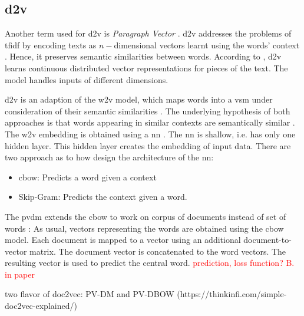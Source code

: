 \subsection{\ac{d2v}}\label{subsec:doc2vec}

Another term used for \ac{d2v} is \textit{Paragraph Vector} \cite{clusteringDocs2020}.
\ac{d2v} addresses the problems of \ac{tfidf} by encoding texts as $n-$dimensional vectors learnt using the words' context \cite{clusteringDocs2020}.
Hence, it preserves semantic similarities between words.
According to \citeauthor{clusteringDocs2020}, \ac{d2v} learns continuous distributed vector representations for pieces of the text.
The model handles inputs of different dimensions.

\ac{d2v} is an adaption of the \ac{w2v} model, which maps words into a \ac{vsm} under consideration of their semantic similarities \cite{clusteringDocs2020}.
The underlying hypothesis of both approaches is that words appearing in similar contexts are semantically similar \cite{clusteringDocs2020}.
The \ac{w2v} embedding is obtained using a \ac{nn} \cite{clusteringDocs2020}.
The \ac{nn} is shallow, i.e. has only one hidden layer.
This hidden layer creates the embedding of input data.
There are two approach as to how design the architecture of the \ac{nn}:
\begin{itemize}
    \item \ac{cbow}: 
        Predicts a word given a context
    \item Skip-Gram: 
        Predicts the context given a word.
\end{itemize}

The \ac{pvdm} extends the \ac{cbow} to work on corpus of documents instead of set of words \cite{clusteringDocs2020}:
As usual, vectors representing the words are obtained using the \ac{cbow} model.
Each document is mapped to a vector using an additional document-to-vector matrix.
The document vector is concatenated to the word vectors.
The resulting vector is used to predict the central word.
\textcolor{red}{prediction, loss function? B. in paper}



\cite{SentRep2014}
two flavor of doc2vec: PV-DM and PV-DBOW (https://thinkinfi.com/simple-doc2vec-explained/)
\cite{SkipGram2013}